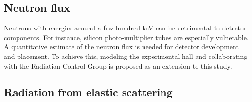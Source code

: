 \subsection{Neutron flux}

Neutrons with energies around a few hundred keV can be detrimental to detector components. For instance, silicon photo-multiplier tubes are especially vulnerable.  A quantitative estimate of the neutron flux is needed for detector development and placement.  To achieve this, modeling the experimental hall and collaborating with the Radiation Control Group is proposed as an extension to this study.

\subsection{Radiation from elastic scattering}


